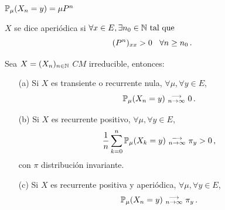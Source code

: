 \begin{notation}
$\P_\mu(X_n=y)=\mu P^n$
\end{notation}
\begin{definition}[Aperiodicidad]
$X$ se dice aperiódica si $\forall x\in E,\exists n_0\in\N\tq$
$$(P^n)_{xx}>0\espacio \forall n\geq n_0 \, .$$
\end{definition}
\begin{theorem}
Sea $X=(X_n)_{n\in \N}$ $CM$ irreducible, entonces:
\begin{itemize}
    \item[(a)] Si $X$ es transiente o recurrente nula, $\forall\mu,\forall y\in E$,     $$ \P_\mu(X_n=y)\conv 0 \, .$$
    \item[(b)] Si $X$ es recurrente positivo, $\forall\mu,\forall y\in E$,
    $$ \displaystyle\frac{1}{n}\sum^n_{k=0}\P_\mu(X_k=y)\conv \pi_y>0 \, ,$$
    con $\pi$ distribución invariante.
    \item[(c)] Si $X$ es recurrente positiva y aperiódica, $\forall\mu,\forall y\in E$,
    $$ \P_\mu(X_n=y)\conv \pi_y \, .$$
\end{itemize}
\end{theorem}

